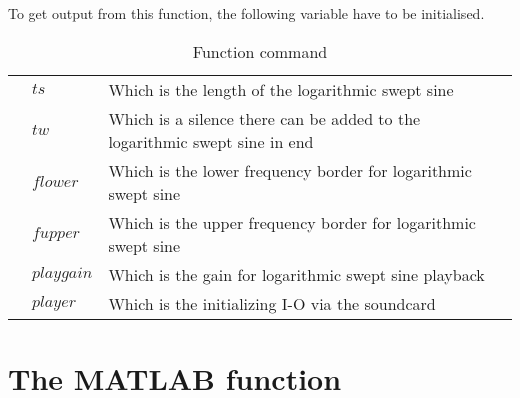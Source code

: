 
To get output from this function, the following variable have to be initialised.



 \begin{table}[H]
\centering
\caption{Function command}
\label{my-label}
\begin{tabular}{lll}
 & $ts$ & Which is the length of the logarithmic swept sine  \\
 & $tw$ & Which is a silence there can be added to the logarithmic swept sine in end   \\
 & $flower$ & Which is the lower frequency border for logarithmic swept sine   \\
 & $fupper$ & Which is the upper frequency border for logarithmic swept sine  \\
 & $playgain$ & Which is the gain for logarithmic swept sine playback   \\
 & $player$  & Which is the initializing I-O via the soundcard
\end{tabular}
\end{table}



\section*{The MATLAB function}

